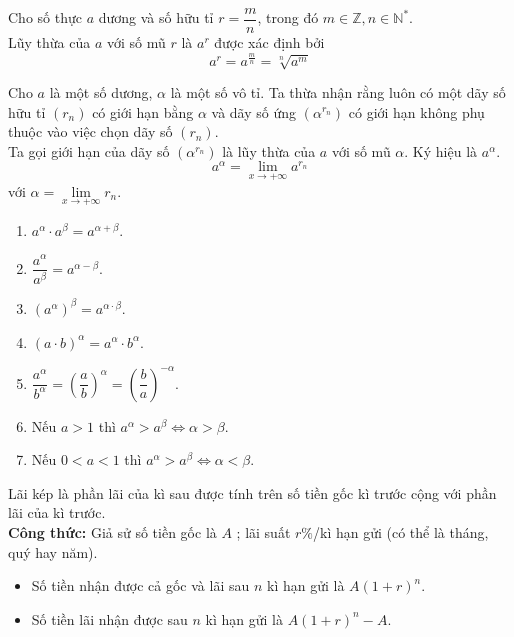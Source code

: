 \begin{dn}\hfill
Cho số thực $a$ dương và  số hữu tỉ $r=\dfrac{m}{n}$, trong đó $m\in\mathbb{Z},n\in\mathbb{N}^*$.\\
Lũy thừa của $a$ với số mũ $r$ là $a^r$ được xác định bởi $$a^r=a^{\frac{m}{n}}=\sqrt[n]{a^m}$$
\end{dn}

\begin{dn}
Cho $a$ là một số dương, $\alpha$ là một số vô tỉ. Ta thừa nhận rằng luôn có một dãy số hữu tỉ $(r_n)$ có giới hạn bằng $\alpha$ và dãy số ứng $\left(\alpha^{r_n}\right)$ có giới hạn không phụ thuộc vào việc chọn dãy số $(r_n)$.\\
Ta gọi giới hạn của dãy số $\left(\alpha^{r_n}\right)$ là lũy thừa của $a$ với số mũ $\alpha$. Ký hiệu là $a^{\alpha}$.
$$a^{\alpha}=\lim\limits_{x\to +\infty}a^{r_n}$$ với $\alpha=\lim\limits_{x\to +\infty}r_n$.
\end{dn}

\begin{tc}\hfill
\begin{multicols}{2}
\begin{enumerate}
\item $a^{\alpha}\cdot a^{\beta}=a^{\alpha+\beta}$.
\item $\dfrac{a^{\alpha}}{a^{\beta}}=a^{\alpha-\beta}$.
\item $\left(a^{\alpha}\right)^{\beta}=a^{\alpha\cdot\beta}$.
\item $(a\cdot b)^{\alpha}=a^{\alpha}\cdot b^{\alpha}$.
\item $\dfrac{a^{\alpha}}{b^{\alpha}}=\left(\dfrac{a}{b}\right)^{\alpha}=\left(\dfrac{b}{a}\right)^{-\alpha}$.
\item Nếu $a>1$ thì $a^{\alpha}>a^{\beta}\Leftrightarrow \alpha>\beta$.
\item Nếu $0<a<1$ thì $a^{\alpha}>a^{\beta}\Leftrightarrow \alpha<\beta$.
\end{enumerate}
\end{multicols}
\end{tc}

\begin{dn}
Lãi kép là phần lãi của kì sau được tính trên số tiền gốc kì trước cộng với phần lãi của kì trước.\\
\textbf{Công thức:} Giả sử số tiền gốc là $A$ ; lãi suất $r\%$/kì hạn gửi (có thể là tháng, quý hay năm).
\begin{itemize}
\item Số tiền nhận được cả gốc và lãi sau $n$ kì hạn gửi là $A(1+r)^n$.
\item Số tiền lãi nhận được sau $n$ kì hạn gửi là $A(1+r)^n-A$.
\end{itemize}
\end{dn}
